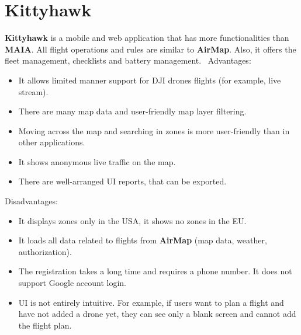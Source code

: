 \section{Kittyhawk}\label{sec:kittyhawk}
\textbf{Kittyhawk} is a mobile and web application that has more functionalities than \textbf{MAIA}.
All flight operations and rules are similar to \textbf{AirMap}.
Also, it offers the fleet management, checklists and battery management.~\cite{kittyhawk}
\newline
\newline
Advantages:
\begin{itemize}
    \item It allows limited manner support for DJI drones flights (for example, live stream).
    \item There are many map data and user-friendly map layer filtering.
    \item Moving across the map and searching in zones is more user-friendly than in other applications.
    \item It shows anonymous live traffic on the map.
    \item There are well-arranged UI reports, that can be exported.
\end{itemize}
Disadvantages:
\begin{itemize}
    \item It displays zones only in the USA, it shows no zones in the EU.
    \item It loads all data related to flights from \textbf{AirMap} (map data, weather, authorization).
    \item The registration takes a long time and requires a phone number.
    It does not support Google account login.
    \item UI is not entirely intuitive.
    For example, if users want to plan a flight and have not added a drone yet, they can see only a blank screen and cannot add the flight plan.
\end{itemize}
